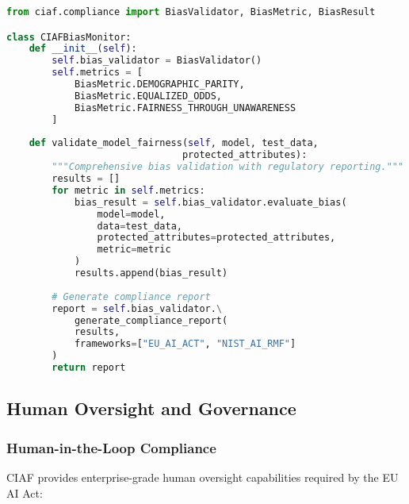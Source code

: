 \documentclass[12pt,a4paper]{article}
\begin{document}
\begin{lstlisting}[language=Python, caption=Bias Detection Implementation]
from ciaf.compliance import BiasValidator, BiasMetric, BiasResult

class CIAFBiasMonitor:
    def __init__(self):
        self.bias_validator = BiasValidator()
        self.metrics = [
            BiasMetric.DEMOGRAPHIC_PARITY,
            BiasMetric.EQUALIZED_ODDS,
            BiasMetric.FAIRNESS_THROUGH_UNAWARENESS
        ]
    
    def validate_model_fairness(self, model, test_data, 
                               protected_attributes):
        """Comprehensive bias validation with regulatory reporting."""
        results = []
        for metric in self.metrics:
            bias_result = self.bias_validator.evaluate_bias(
                model=model,
                data=test_data,
                protected_attributes=protected_attributes,
                metric=metric
            )
            results.append(bias_result)
        
        # Generate compliance report
        report = self.bias_validator.\
            generate_compliance_report(
            results, 
            frameworks=["EU_AI_ACT", "NIST_AI_RMF"]
        )
        return report
\end{lstlisting}

\subsection{Human Oversight and Governance}

\subsubsection{Human-in-the-Loop Compliance}

CIAF provides enterprise-grade human oversight capabilities required by the EU AI Act:
\end{document}
